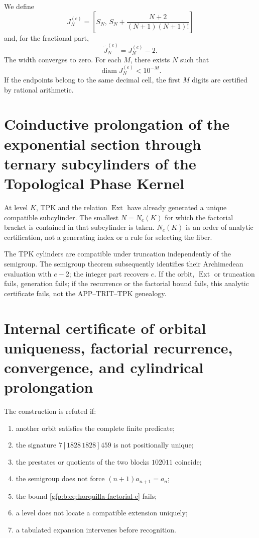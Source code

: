 We define
\[
 J_N^{(e)}=
 \left[
 S_N,\,
 S_N+\frac{N+2}{(N+1)(N+1)!}
 \right]
\]
and, for the fractional part,
\[
 \widetilde J_N^{(e)}=J_N^{(e)}-2.
\]
The width converges to zero. For each \(M\), there exists \(N\) such that
\[
 \operatorname{diam}J_N^{(e)}<10^{-M}.
\]
If the endpoints belong to the same decimal cell, the first \(M\)
digits are certified by rational arithmetic.

\section{Coinductive prolongation of the exponential section through ternary subcylinders of the Topological Phase Kernel}

At level \(K\), TPK and the relation \(\operatorname{Ext}\) have already generated
a unique compatible subcylinder. The smallest \(N=N_e(K)\) for which
the factorial bracket is contained in that subcylinder is taken. \(N_e(K)\) is an
order of analytic certification, not a generating index or a rule for
selecting the fiber.

The TPK cylinders are compatible under truncation independently of the
semigroup. The semigroup theorem subsequently identifies their Archimedean
evaluation with \(e-2\); the integer part recovers \(e\). If the orbit,
\(\operatorname{Ext}\) or truncation fails, generation fails; if the
recurrence or the factorial bound fails, this analytic certificate fails, not the
APP--TRIT--TPK genealogy.

\section{Internal certificate of orbital uniqueness, factorial recurrence, convergence, and cylindrical prolongation}

\begin{remark}
The construction is refuted if:
\begin{enumerate}
 \item another orbit satisfies the complete finite predicate;
 \item the signature \(7[1828\,1828]459\) is not positionally unique;
 \item the prestates or quotients of the two blocks \(102011\) coincide;
 \item the semigroup does not force \((n+1)a_{n+1}=a_n\);
 \item the bound \eqref{gfp:b:eq:horquilla-factorial-e} fails;
 \item a level does not locate a compatible extension uniquely;
 \item a tabulated expansion intervenes before recognition.
\end{enumerate}
\end{remark}
